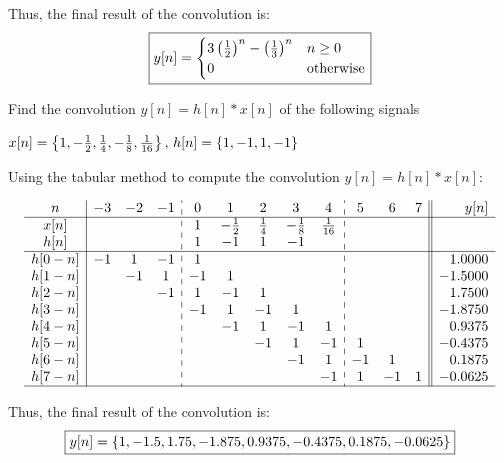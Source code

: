 \documentclass[a4paper, 10pt]{article}
\begin{document}
\begin{solution}
Thus, the final result of the convolution is:
\[ \boxed{
y[n] = \begin{cases}
3 \left( \frac{1}{2} \right)^n - \left( \frac{1}{3} \right)^n & n \geq 0 \\
0 & \text{otherwise}
\end{cases}
} \]
\end{solution}

\newpage

\begin{problem}
    Find the convolution \( y[n] = h[n] * x[n] \) of the following signals
\end{problem}

\begin{subproblems}[start=1]
    \item \( x[n] = \left\{ 1, -\frac{1}{2}, \frac{1}{4}, -\frac{1}{8}, \frac{1}{16} \right\},\, h[n] = \left\{ 1, -1, 1, -1 \right\} \)
\end{subproblems}

\begin{solution}
Using the tabular method to compute the convolution \( y[n] = h[n] * x[n] \):

\renewcommand{\arraystretch}{1.3}
\[
\begin{array}{c|ccc:ccccc:ccc||r}
n  & -3 & -2 & -1 & 0 & 1 & 2 & 3 & 4 & 5 & 6 & 7 & y[n] \\
\hline
x[n] &  &  &  & 1 & -\frac{1}{2} & \frac{1}{4} & -\frac{1}{8} & \frac{1}{16} &  &  &  &  \\
h[n] &  &  &  & 1 & -1 & 1 & -1 &  &  &  &  &  \\
\hline
h[0-n] & -1 & 1 & -1 & 1 &  &  &  &  &  &  &  & 1.0000 \\
h[1-n] &  & -1 & 1 & -1 & 1 &  &  &  &  &  &  & -1.5000 \\
h[2-n] &  &  & -1 & 1 & -1 & 1 &  &  &  &  &  & 1.7500 \\
h[3-n] &  &  &  & -1 & 1 & -1 & 1 &  &  &  &  & -1.8750 \\
h[4-n] &  &  &  &  & -1 & 1 & -1 & 1 &  &  &  & 0.9375 \\
h[5-n] &  &  &  &  &  & -1 & 1 & -1 & 1 &  &  & -0.4375 \\
h[6-n] &  &  &  &  &  &  & -1 & 1 & -1 & 1 &  & 0.1875 \\
h[7-n] &  &  &  &  &  &  &  & -1 & 1 & -1 & 1 & -0.0625 \\
\hline
\end{array}
\]

Thus, the final result of the convolution is:
\[ \boxed{ y[n] = \left\{ 1, -1.5, 1.75, -1.875, 0.9375, -0.4375, 0.1875, -0.0625 \right\} } \]
\end{solution}
\end{document}
